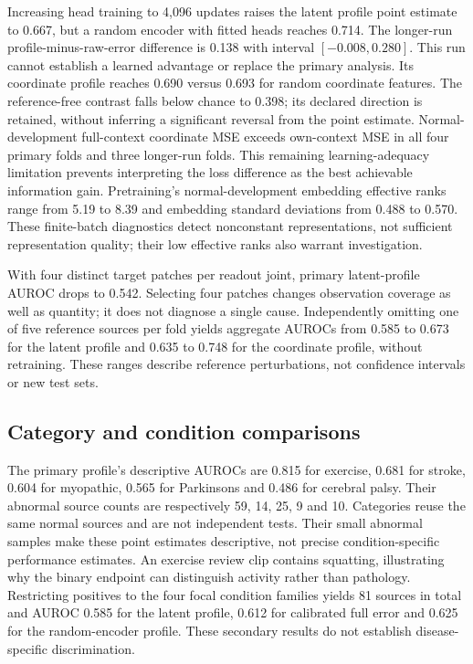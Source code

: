\documentclass[letterpaper]{article}
\begin{document}
Increasing head training to 4,096 updates raises the latent profile point estimate to 0.667, but a random encoder with fitted heads reaches 0.714. The longer-run profile-minus-raw-error difference is 0.138 with interval \([-0.008, 0.280]\). This run cannot establish a learned advantage or replace the primary analysis. Its coordinate profile reaches 0.690 versus 0.693 for random coordinate features. The reference-free contrast falls below chance to 0.398; its declared direction is retained, without inferring a significant reversal from the point estimate. Normal-development full-context coordinate MSE exceeds own-context MSE in all four primary folds and three longer-run folds. This remaining learning-adequacy limitation prevents interpreting the loss difference as the best achievable information gain. Pretraining's normal-development embedding effective ranks range from 5.19 to 8.39 and embedding standard deviations from 0.488 to 0.570. These finite-batch diagnostics detect nonconstant representations, not sufficient representation quality; their low effective ranks also warrant investigation.

With four distinct target patches per readout joint, primary latent-profile AUROC drops to 0.542. Selecting four patches changes observation coverage as well as quantity; it does not diagnose a single cause. Independently omitting one of five reference sources per fold yields aggregate AUROCs from 0.585 to 0.673 for the latent profile and 0.635 to 0.748 for the coordinate profile, without retraining. These ranges describe reference perturbations, not confidence intervals or new test sets.

\subsection{Category and condition comparisons}

The primary profile's descriptive AUROCs are 0.815 for exercise, 0.681 for stroke, 0.604 for myopathic, 0.565 for Parkinsons and 0.486 for cerebral palsy. Their abnormal source counts are respectively 59, 14, 25, 9 and 10. Categories reuse the same normal sources and are not independent tests. Their small abnormal samples make these point estimates descriptive, not precise condition-specific performance estimates. An exercise review clip contains squatting, illustrating why the binary endpoint can distinguish activity rather than pathology. Restricting positives to the four focal condition families yields 81 sources in total and AUROC 0.585 for the latent profile, 0.612 for calibrated full error and 0.625 for the random-encoder profile. These secondary results do not establish disease-specific discrimination.
\end{document}
